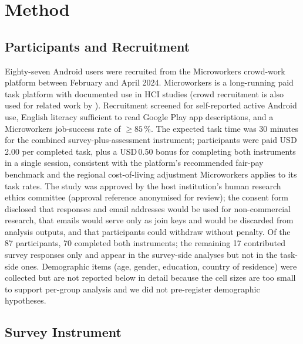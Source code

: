 \documentclass[11pt,a4paper]{article}
\makeatletter
\let\@oldsection\section
\renewcommand{\section}{\FloatBarrier\@oldsection}
\makeatother
\begin{document}
\section{Method}
\label{sec:method}

\subsection{Participants and Recruitment}
\label{subsec:participants}

Eighty-seven Android users were recruited from the Microworkers
crowd-work platform between February and April 2024. Microworkers is a
long-running paid task platform with documented use in HCI studies
(crowd recruitment is also used for related work by
\citealt{lin:etal:2012,naeini:etal:2017}). Recruitment screened for
self-reported active Android use, English literacy sufficient to read
Google Play app descriptions, and a Microworkers job-success rate of
$\geq 85$\,\%. The expected task time was 30 minutes for the combined
survey-plus-assessment instrument; participants were paid USD\,2.00
per completed task, plus a USD\,0.50 bonus for completing both
instruments in a single session, consistent with the platform's
recommended fair-pay benchmark and the regional cost-of-living
adjustment Microworkers applies to its task rates. The study was
approved by the host institution's human research ethics committee
(approval reference anonymised for review); the consent form disclosed
that responses and email addresses would be used for non-commercial
research, that emails would serve only as join keys and would be
discarded from analysis outputs, and that participants could withdraw
without penalty. Of the 87 participants, 70 completed both
instruments; the remaining 17 contributed survey responses only and
appear in the survey-side analyses but not in the task-side ones.
Demographic items (age, gender, education, country of residence) were
collected but are not reported below in detail because the cell sizes
are too small to support per-group analysis and we did not pre-register
demographic hypotheses.

\subsection{Survey Instrument}
\label{subsec:survey}
\end{document}
